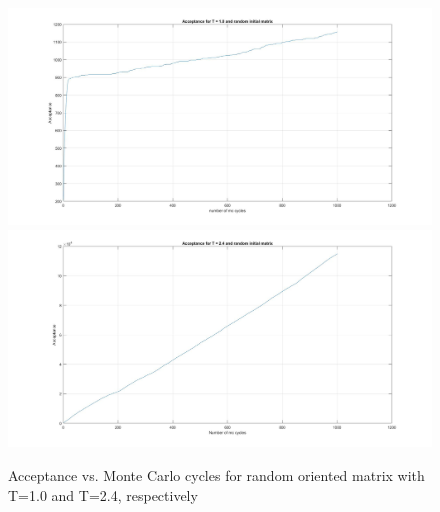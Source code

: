 \documentclass[10pt,a4paper]{article}
\begin{document}
\begin{figure}[H]
\centerline{
\includegraphics[scale=0.15]{acceptanceMCT1random}
\includegraphics[scale=0.15]{acceptanceMCT24random}
}
\caption{Acceptance vs. Monte Carlo cycles for random oriented matrix with T=1.0 and T=2.4, respectively}
\label{fig:accran}
\end{figure}
\end{document}

